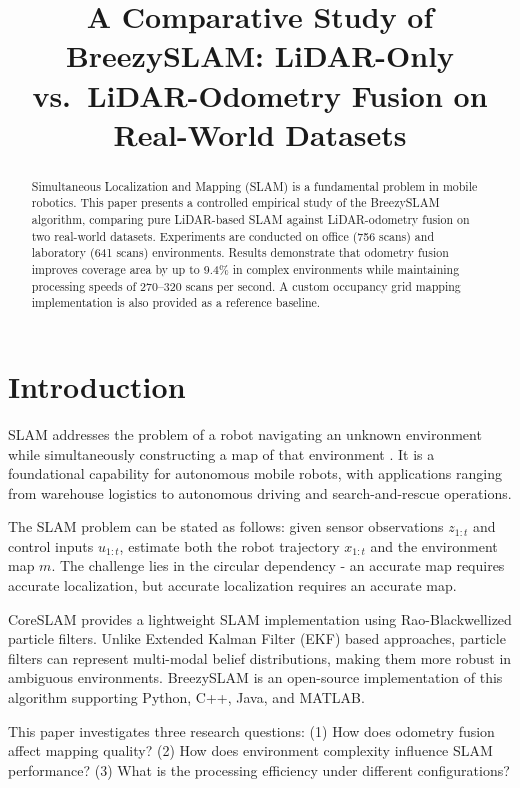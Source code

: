 \documentclass[conference]{IEEEtran}
\title{A Comparative Study of BreezySLAM: LiDAR-Only vs.~LiDAR-Odometry Fusion on Real-World Datasets}
\author{
  \IEEEauthorblockN{Yifan Tao}
  \IEEEauthorblockA{Participant 005\\Session 5 2D-SLAM Experiments}
  }
\begin{document}
  \maketitle

  \begin{abstract}
  Simultaneous Localization and Mapping (SLAM) is a fundamental problem in mobile robotics. This paper
  presents a controlled empirical study of the BreezySLAM algorithm, comparing pure LiDAR-based SLAM
  against LiDAR-odometry fusion on two real-world datasets. Experiments are conducted on office (756
  scans) and laboratory (641 scans) environments. Results demonstrate that odometry fusion improves
  coverage area by up to 9.4\% in complex environments while maintaining processing speeds of 270--320
  scans per second. A custom occupancy grid mapping implementation is also provided as a reference
  baseline.
  \end{abstract}

  \section{Introduction}

  SLAM addresses the problem of a robot navigating an unknown environment while simultaneously
  constructing a map of that environment \cite{thrun2005}. It is a foundational capability for autonomous
  mobile robots, with applications ranging from warehouse logistics to autonomous driving and
  search-and-rescue operations.

  The SLAM problem can be stated as follows: given sensor observations $z_{1:t}$ and control inputs
  $u_{1:t}$, estimate both the robot trajectory $x_{1:t}$ and the environment map $m$. The challenge lies
  in the circular dependency - an accurate map requires accurate localization, but accurate localization
  requires an accurate map.

  CoreSLAM \cite{coreslam2010} provides a lightweight SLAM implementation using Rao-Blackwellized particle
  filters. Unlike Extended Kalman Filter (EKF) based approaches, particle filters can represent
  multi-modal belief distributions, making them more robust in ambiguous environments. BreezySLAM
  \cite{breezyslam} is an open-source implementation of this algorithm supporting Python, C++, Java, and
  MATLAB.

  This paper investigates three research questions: (1) How does odometry fusion affect mapping quality?
  (2) How does environment complexity influence SLAM performance? (3) What is the processing efficiency
  under different configurations?
\end{document}
